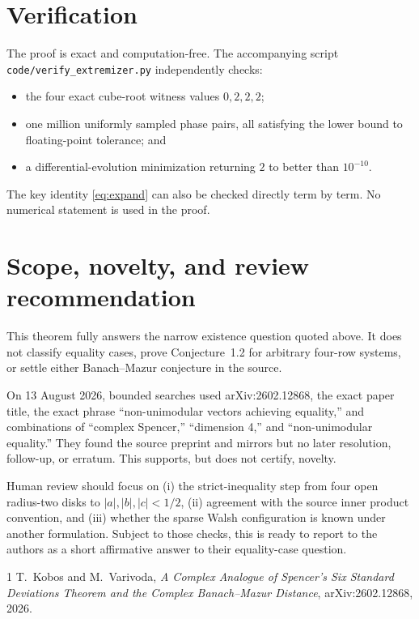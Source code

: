 \documentclass[11pt]{article}
\begin{document}
\section{Verification}

The proof is exact and computation-free.  The accompanying script
\texttt{code/verify\_extremizer.py} independently checks:
\begin{itemize}
\item the four exact cube-root witness values $0,2,2,2$;
\item one million uniformly sampled phase pairs, all satisfying the lower
bound to floating-point tolerance; and
\item a differential-evolution minimization returning $2$ to better than
$10^{-10}$.
\end{itemize}
The key identity \eqref{eq:expand} can also be checked directly term by term.
No numerical statement is used in the proof.

\section{Scope, novelty, and review recommendation}

This theorem fully answers the narrow existence question quoted above.  It
does not classify equality cases, prove Conjecture~1.2 for arbitrary four-row
systems, or settle either Banach--Mazur conjecture in the source.

On 13 August 2026, bounded searches used arXiv:2602.12868, the exact paper
title, the exact phrase ``non-unimodular vectors achieving equality,'' and
combinations of ``complex Spencer,'' ``dimension 4,'' and ``non-unimodular
equality.''  They found the source preprint and mirrors but no later resolution,
follow-up, or erratum.  This supports, but does not certify, novelty.

Human review should focus on (i) the strict-inequality step from four open
radius-two disks to $|a|,|b|,|c|<1/2$, (ii) agreement with the source inner
product convention, and (iii) whether the sparse Walsh configuration is known
under another formulation.  Subject to those checks, this is ready to report
to the authors as a short affirmative answer to their equality-case question.

\begin{thebibliography}{1}
T.~Kobos and M.~Varivoda,
\emph{A Complex Analogue of Spencer's Six Standard Deviations Theorem and the
Complex Banach--Mazur Distance}, arXiv:2602.12868, 2026.
\end{thebibliography}
\end{document}
